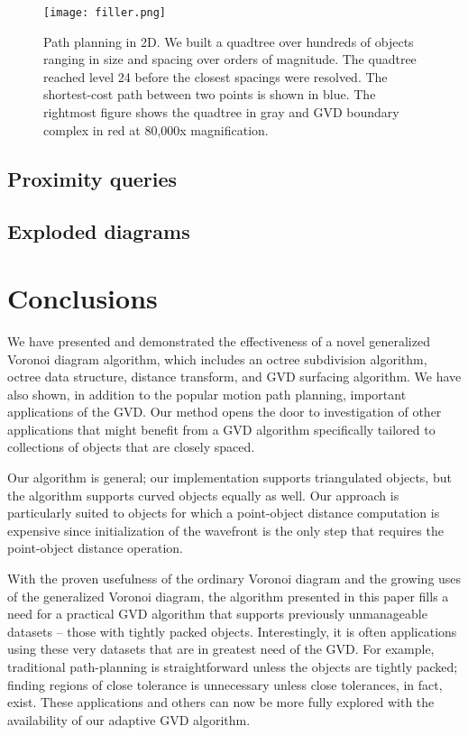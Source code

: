 \documentclass{egpubl}
\begin{document}
\begin{figure*}
  \centering
  \texttt{[image: filler.png]}
  \caption{Path planning in 2D.  We built a quadtree over hundreds of objects ranging in size and spacing over orders of magnitude.  The quadtree reached level 24 before the closest spacings were resolved.  The shortest-cost path between two points is shown in blue.  The rightmost figure shows the quadtree in gray and GVD boundary complex in red at 80,000x magnification.}
  \label{fig:path}
\end{figure*}

\subsection{Proximity queries}
\label{sec:proximity}

\subsection{Exploded diagrams}

\section{Conclusions}
We have presented and demonstrated the effectiveness of a novel generalized Voronoi diagram algorithm, which includes an octree subdivision algorithm, octree data structure, distance transform, and GVD surfacing algorithm.  We have also shown, in addition to the popular motion path planning, important applications of the GVD.  Our method opens the door to investigation of other applications that might benefit from a GVD algorithm specifically tailored to collections of objects that are closely spaced.

Our algorithm is general; our implementation supports  triangulated objects, but the algorithm supports curved objects equally as well.  Our approach is particularly suited to objects for which a point-object distance computation is expensive since initialization of the wavefront is the only step that requires the point-object distance operation.

With the proven usefulness of the ordinary Voronoi diagram and the growing uses of the generalized Voronoi diagram, the algorithm presented in this paper fills a need for a practical GVD algorithm that supports previously unmanageable datasets -- those with tightly packed objects.  Interestingly, it is often applications using these very datasets that are in greatest need of the GVD.  For example, traditional path-planning is straightforward unless the objects are tightly packed; finding regions of close tolerance is unnecessary unless close tolerances, in fact, exist.  These applications and others can now be more fully explored with the availability of our adaptive GVD algorithm.
\end{document}
